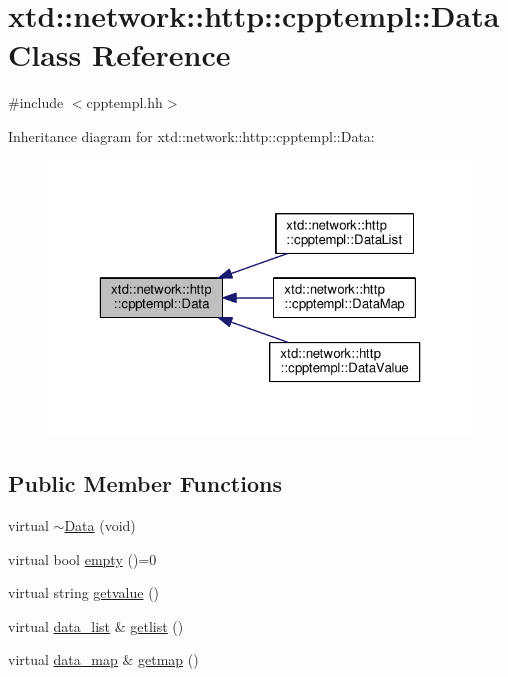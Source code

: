 \hypertarget{classxtd_1_1network_1_1http_1_1cpptempl_1_1Data}{}\section{xtd\+:\+:network\+:\+:http\+:\+:cpptempl\+:\+:Data Class Reference}
\label{classxtd_1_1network_1_1http_1_1cpptempl_1_1Data}


{\ttfamily \#include $<$cpptempl.\+hh$>$}



Inheritance diagram for xtd\+:\+:network\+:\+:http\+:\+:cpptempl\+:\+:Data\+:
\nopagebreak
\begin{figure}[H]
\begin{center}
\leavevmode
\includegraphics[width=323pt]{classxtd_1_1network_1_1http_1_1cpptempl_1_1Data__inherit__graph}
\end{center}
\end{figure}
\subsection*{Public Member Functions}
\begin{DoxyCompactItemize}
\item 
virtual \hyperlink{classxtd_1_1network_1_1http_1_1cpptempl_1_1Data_a4bbb052aa314ffb321edee297cf393e1}{$\sim$\+Data} (void)
\item 
virtual bool \hyperlink{classxtd_1_1network_1_1http_1_1cpptempl_1_1Data_a3a64cba1d65950fababffac694561af1}{empty} ()=0
\item 
virtual string \hyperlink{classxtd_1_1network_1_1http_1_1cpptempl_1_1Data_a85999dd8f43177cabf072ddbc406e556}{getvalue} ()
\item 
virtual \hyperlink{namespacextd_1_1network_1_1http_1_1cpptempl_aff1b51bcf8064f69c85dd4833c1853b4}{data\+\_\+list} \& \hyperlink{classxtd_1_1network_1_1http_1_1cpptempl_1_1Data_abb82f257b867cd0da2469cc6c5ecdbae}{getlist} ()
\item 
virtual \hyperlink{namespacextd_1_1network_1_1http_1_1cpptempl_a638d1d81c8fb63c0bbafd508d6a2a007}{data\+\_\+map} \& \hyperlink{classxtd_1_1network_1_1http_1_1cpptempl_1_1Data_a39713cc7cdc05a2375c1c5d4f00772db}{getmap} ()
\end{DoxyCompactItemize}


